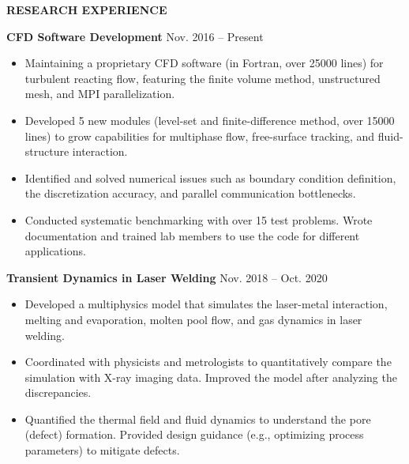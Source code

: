\documentclass[11pt, letterpaper]{article}
\begin{document}
\vspace{9pt}

\textbf{RESEARCH EXPERIENCE}

\fullrule

\textbf{CFD Software Development} \hfill Nov. 2016 -- Present
\begin{itemize}[leftmargin=*, labelsep=5mm]
   \item Maintaining a proprietary CFD software (in Fortran, over 25000 lines) for turbulent
      reacting flow, featuring the finite volume method, unstructured mesh, and MPI parallelization.
   \item Developed 5 new modules (level-set and finite-difference method, over 15000 lines) to grow
      capabilities for multiphase flow, free-surface tracking, and fluid-structure interaction.
   \item Identified and solved numerical issues such as boundary condition definition, the
      discretization accuracy, and parallel communication bottlenecks.
   \item Conducted systematic benchmarking with over 15 test problems. Wrote documentation and
      trained lab members to use the code for different applications.
\end{itemize}

\vspace{3pt}

\textbf{Transient Dynamics in Laser Welding} \hfill Nov. 2018 -- Oct. 2020
\begin{itemize}[leftmargin=*, labelsep=5mm]
   \item Developed a multiphysics model that simulates the laser-metal interaction, melting and
      evaporation, molten pool flow, and gas dynamics in laser welding.
   \item Coordinated with physicists and metrologists to quantitatively compare the simulation with
      X-ray imaging data. Improved the model after analyzing the discrepancies.
   \item Quantified the thermal field and fluid dynamics to understand the pore (defect) formation.
      Provided design guidance (e.g., optimizing process parameters) to mitigate defects.
\end{itemize}
\end{document}
